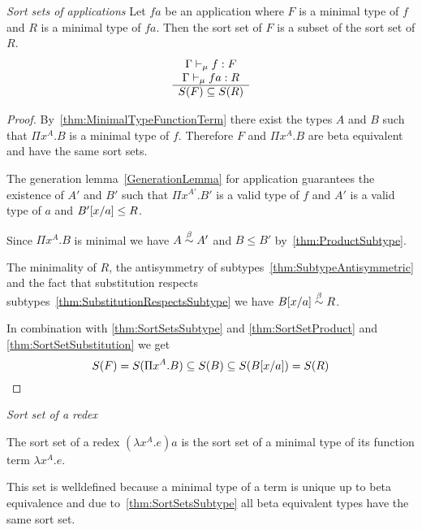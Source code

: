 \begin{theorem}
    \label{thm:SortSetApplication}
    \emph{Sort sets of applications} Let $fa$ be an application where $F$ is a
    minimal type of $f$ and $R$ is a minimal type of $fa$. Then the sort set of
    $F$ is a subset of the sort set of $R$.
    $$
    \ruleh{
        \Gamma \vdashmin f : F
        \\
        \Gamma \vdashmin fa : R
    }
    {
        S(F) \subseteq S(R)
    }
    $$
    \begin{proof}

        By~\ref{thm:MinimalTypeFunctionTerm} there exist the types $A$ and $B$
        such that $\Pi x^A. B$ is a minimal type of $f$. Therefore $F$ and $\Pi
        x^A.B$ are beta equivalent and have the same sort sets.

        The generation lemma~\ref{GenerationLemma} for application guarantees
        the existence of $A'$ and $B'$ such that $\Pi x^{A'}.B'$ is a valid type
        of $f$ and $A'$ is a valid type of $a$ and $\sub a x {B'} \le R$.

        Since $\Pi x^A. B$ is minimal we have $A \betaeq A'$ and $B \le B'$
        by~\ref{thm:ProductSubtype}.

        The minimality of $R$, the antisymmetry of
        subtypes~\ref{thm:SubtypeAntisymmetric} and the fact that
        substitution respects subtypes~\ref{thm:SubstitutionRespectsSubtype} we
        have $\sub a x B \betaeq R$.

        In combination with \ref{thm:SortSetsSubtype} and
        \ref{thm:SortSetProduct} and \ref{thm:SortSetSubstitution} we get
        $$
        S(F) = S(\Pi x^A. B)
            \subseteq S(B)
            \subseteq S(\sub a x B)
            = S(R)
        $$
    \end{proof}
\end{theorem}






\begin{definition}
    \label{def:RedexSortSet}
    \emph{Sort set of a redex}

    The sort set of a redex $(\lambda x^A. e) a$ is the sort set of a
    minimal type of its function term $\lambda x^A. e$.

    This set is welldefined because a minimal type of a term is unique up to
    beta equivalence and due to~\ref{thm:SortSetsSubtype} all beta equivalent
    types have the same sort set.
\end{definition}




